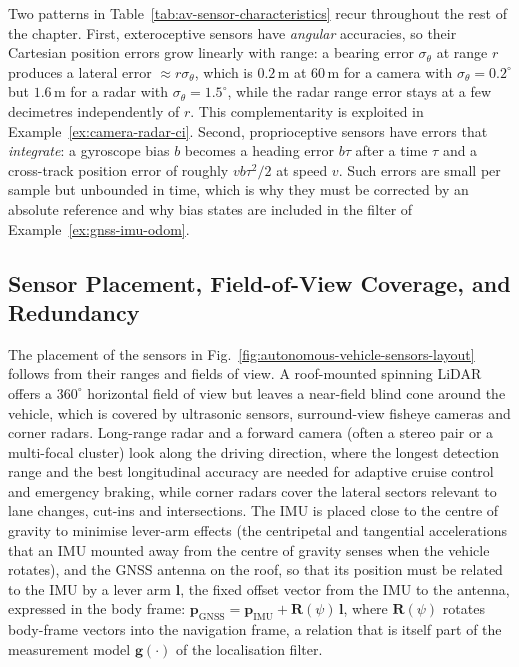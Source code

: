 Two patterns in Table~\ref{tab:av-sensor-characteristics} recur throughout the rest of the chapter. First, exteroceptive sensors have \emph{angular} accuracies, so their Cartesian position errors grow linearly with range: a bearing error $\sigma_{\theta}$ at range $r$ produces a lateral error $\approx r\sigma_{\theta}$, which is $0.2$\,m at $60$\,m for a camera with $\sigma_{\theta}=0.2^{\circ}$ but $1.6$\,m for a radar with $\sigma_{\theta}=1.5^{\circ}$, while the radar range error stays at a few decimetres independently of $r$. This complementarity is exploited in Example~\ref{ex:camera-radar-ci}. Second, proprioceptive sensors have errors that \emph{integrate}: a gyroscope bias $b$ becomes a heading error $b\tau$ after a time $\tau$ and a cross-track position error of roughly $v b\tau^{2}/2$ at speed $v$. Such errors are small per sample but unbounded in time, which is why they must be corrected by an absolute reference and why bias states are included in the filter of Example~\ref{ex:gnss-imu-odom}.

\subsection{Sensor Placement, Field-of-View Coverage, and Redundancy}
\label{subsec:placement}

The placement of the sensors in Fig.~\ref{fig:autonomous-vehicle-sensors-layout} follows from their ranges and fields of view. A roof-mounted spinning LiDAR offers a $360^{\circ}$ horizontal field of view but leaves a near-field blind cone around the vehicle, which is covered by ultrasonic sensors, surround-view fisheye cameras and corner radars. Long-range radar and a forward camera (often a stereo pair or a multi-focal cluster) look along the driving direction, where the longest detection range and the best longitudinal accuracy are needed for adaptive cruise control and emergency braking, while corner radars cover the lateral sectors relevant to lane changes, cut-ins and intersections. The IMU is placed close to the centre of gravity to minimise lever-arm effects (the centripetal and tangential accelerations that an IMU mounted away from the centre of gravity senses when the vehicle rotates), and the GNSS antenna on the roof, so that its position must be related to the IMU by a lever arm $\mathbf{l}$, the fixed offset vector from the IMU to the antenna, expressed in the body frame: $\mathbf{p}_{\mathrm{GNSS}}=\mathbf{p}_{\mathrm{IMU}}+\mathbf{R}(\psi)\,\mathbf{l}$, where $\mathbf{R}(\psi)$ rotates body-frame vectors into the navigation frame, a relation that is itself part of the measurement model $\mathbf{g}(\cdot)$ of the localisation filter.

